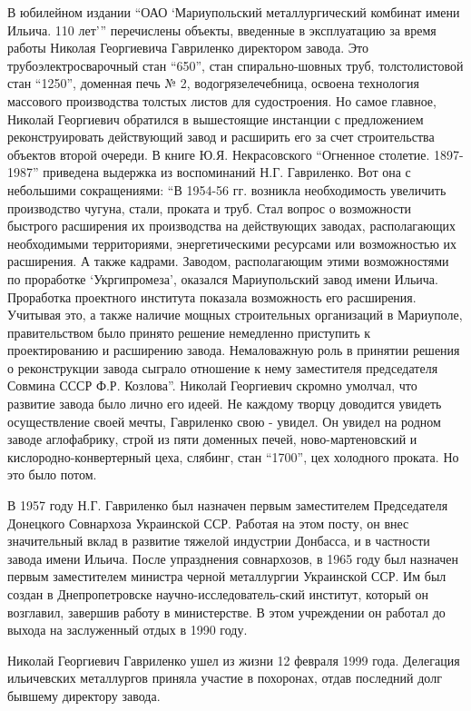 В юбилейном издании  \enquote{ОАО \enquote{Мариупольский металлургический комбинат имени Ильича. 110 лет}} 
перечислены объекты, введенные в эксплуатацию за время работы
Николая Георгиевича Гавриленко директором завода. Это трубоэлектросварочный
стан \enquote{650}, стан спирально-шовных труб, толстолистовой стан \enquote{1250}, доменная
печь № 2, водогрязелечебница, освоена технология массового производства
толстых листов  для судостроения. Но самое главное, Николай Георгиевич
обратился в вышестоящие инстанции с предложением реконструировать действующий
завод и расширить его за счет строительства объектов второй очереди. В книге
Ю.Я. Некрасовского \enquote{Огненное столетие. 1897-1987} приведена выдержка из
воспоминаний Н.Г. Гавриленко. Вот она с небольшими сокращениями: \enquote{В 1954-56 гг.
возникла необходимость увеличить производство чугуна, стали, проката и труб.
Стал вопрос о возможности быстрого расширения их производства на действующих
заводах, располагающих необходимыми территориями, энергетическими ресурсами или
возможностью их расширения. А также кадрами. Заводом, располагающим этими
возможностями по проработке \enquote{Укргипромеза}, оказался Мариупольский завод имени
Ильича. Проработка проектного института показала возможность его расширения.
Учитывая это, а также наличие мощных строительных организаций в Мариуполе,
правительством было принято решение немедленно приступить к проектированию и
расширению завода. Немаловажную роль в принятии решения о реконструкции завода
сыграло отношение к нему заместителя председателя Совмина СССР Ф.Р. Козлова}.
Николай Георгиевич скромно умолчал, что развитие завода было лично его идеей.
Не каждому творцу доводится увидеть осуществление своей мечты, Гавриленко свою
- увидел. Он увидел на родном заводе аглофабрику, строй из пяти доменных печей,
ново-мартеновский и кислородно-конвертерный цеха, слябинг, стан \enquote{1700}, цех
холодного проката. Но это было потом.

В 1957 году Н.Г. Гавриленко был назначен первым заместителем Председателя
Донецкого Совнархоза Украинской ССР. Работая на этом посту, он внес
значительный вклад в развитие тяжелой индустрии Донбасса, и в частности завода
имени Ильича. После упразднения совнархозов, в 1965 году  был назначен первым
заместителем министра черной металлургии Украинской ССР. Им был создан в
Днепропетровске научно-исследователь\hyp{}ский институт, который он возглавил,
завершив работу в министерстве. В этом учреждении он работал до выхода на
заслуженный отдых в 1990 году.

Николай Георгиевич Гавриленко ушел из жизни 12 февраля 1999 года. Делегация
ильичевских металлургов приняла участие в похоронах, отдав последний долг
бывшему директору завода.
